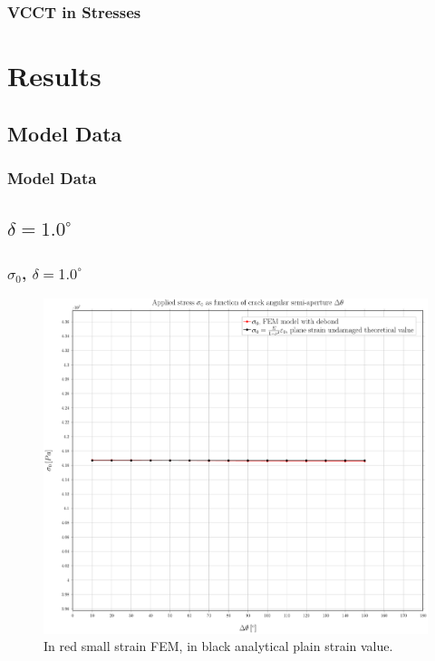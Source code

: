 \documentclass[first,firstsupp,lastsupp,handout,last,hyperref,table]{ETHclass}
\begin{document}
\begin{frame}
\frametitle{\small VCCT  in Stresses}
\vspace{-0.5cm}
\tiny
\centering
\captionsetup[figure]{font=scriptsize,labelfont=scriptsize}

\end{frame}

\section{Results}

\subsection{Model Data}
\begin{frame}
\frametitle{Model Data}
\vspace{-0.5cm}
\centering

\end{frame}


\subsection{$\delta=1.0^{\circ}$}

\begin{frame}
\frametitle{\small $\sigma_{0}$, $\delta=1.0^{\circ}$}
\vspace{-0.5cm}
\centering
\captionsetup[figure]{font=scriptsize,labelfont=scriptsize}
\begin{figure}[!h]
\centering
\includegraphics[height=0.7\textheight]{2017-07-10_AbqRunSummary_SmallStrainD10_sigma-inf_Summary.pdf}
  \caption{\scriptsize In red small strain FEM, in black analytical plain strain value.}
  \label{fig:res1}
\end{figure}
\end{frame}
\end{document}
